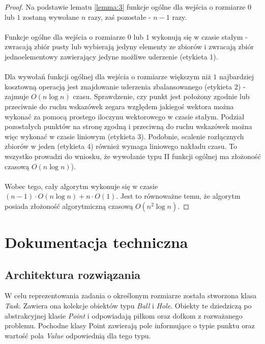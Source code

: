 \documentclass[10pt,a4paper]{article}
\begin{document}
	\begin{proof}
		Na podstawie lematu \ref{lemma:3} funkcje ogólne dla wejścia o rozmiarze $0$ lub $1$ zostaną wywołane $n$ razy, zaś pozostałe - $n - 1$ razy. \\~\\
		Funkcje ogólne dla wejścia o rozmiarze $0$ lub $1$ wykonują się w czasie stałym - zwracają zbiór pusty lub wybierają jedyny elementy ze zbiorów i zwracają zbiór jednoelementowy zawierający jedyne możliwe uderzenie (etykieta 1).\\~\\
		Dla wywołań funkcji ogólnej dla wejścia o rozmiarze większym niż $1$ najbardziej kosztowną operacją jest znajdowanie uderzenia zbalansowanego (etykieta 2) - zajmuje $O(n \log n)$ czasu. Sprawdzenie, czy punkt jest położony zgodnie lub przeciwnie do ruchu wskazówek zegara względem jakiegoś wektora można wykonać za pomocą prostego iloczynu wektorowego w czasie stałym. Podział pozostałych punktów na stronę zgodną i przeciwną do ruchu wskazówek można więc wykonać w czasie liniowym (etykieta 3). Podobnie, scalenie rozłącznych zbiorów w jeden (etykieta 4) również wymaga liniowego nakładu czasu. To wszystko prowadzi do wniosku, że wywołanie typu II funkcji ogólnej ma złożoność czasową $O(n \log n)$).
		\\~\\
		Wobec tego, cały algorytm wykonuje się w czasie $(n - 1) \cdot O(n \log n) + n \cdot O(1)$. Jest to równoważne temu, że algorytm posiada złożoność algorytmiczną czasową $O(n^{2} \log n)$.
	\end{proof}

	\pagebreak
	
	\section{Dokumentacja techniczna}
	
	\subsection{Architektura rozwiązania}
	
	W celu reprezentowania zadania o określonym rozmiarze została stworzona klasa \textit{Task}. Zawiera ona kolekcje obiektów typu \textit{Ball} i \textit{Hole}. Obiekty te dziedziczą po abstrakcyjnej klasie \textit{Point} i odpowiadają piłkom oraz dołkom z rozważanego problemu. Pochodne klasy {Point} zawierają pole informujące o typie punktu oraz wartość pola \textit{Value} odpowiednią dla tego typu.
	
\end{document}
